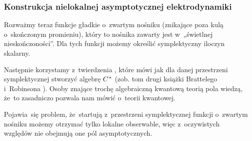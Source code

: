 \documentclass[10pt,t]{beamer}
\begin{document}
\begin{frame}
  \frametitle{Konstrukcja nielokalnej asymptotycznej
    elektrodynamiki}


  Rozważmy teraz funkcje gładkie o~zwartym nośniku (znikające poza kulą
  o~skończonym promieniu), który to nośnika zawarty jest  w~„świetlnej
  nieskończoności”. Dla tych funkcji możemy określić symplektyczny iloczyn
  skalarny.

  Następnie korzystamy z~twierdzenia
  ,
  które mówi jak dla danej przestrzeni symplektycznej stworzyć algebrę
  $C^{ \hspace{0.05em} * }$
  (zob. tom drugi książki Brattelego i~Robinsona
  \parencite{Bratteli-Robinson-Operator-algebras-ETC-Vol-I-Pub-2002}).
  Osoby znające trochę algebraiczną kwantową teorią pola wiedzą, że~to
  zasadniczo pozwala nam mówić o~teorii kwantowej.

  Pojawia~się problem, że~startują z~przestrzeni symplektycznej funkcji
  o~zwartym nośniku możemy otrzymać tylko \alert{lokalne} obserwable,
  więc z~oczywistych względów nie obejmują one pól asymptotycznych.

\end{frame}









\end{document}
